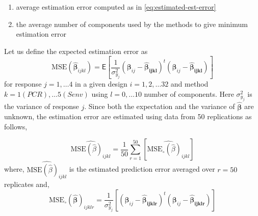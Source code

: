 \documentclass[12pt,3p,authoryear]{elsarticle}
\providecommand{\tightlist}{%
  \setlength{\itemsep}{0pt}\setlength{\parskip}{0pt}}
\begin{document}
\begin{enumerate}
\def\labelenumi{\alph{enumi})}
\tightlist
\item
  average estimation error computed as in \eqref{eq:estimated-est-error}
\item
  the average number of components used by the methods to give minimum estimation error
\end{enumerate}

Let us define the expected estimation error as
\begin{equation}
  \text{MSE}\left(
    \boldsymbol{\hat{\beta}}_{ijkl}
  \right) =
  \mathsf{E}{\left[
    \frac{1}{\sigma_{y_j}^2}\left(
      \boldsymbol{\beta}_{ij} - \boldsymbol{\hat{\beta}_{ijkl}}
    \right)^t
    \left(
      \boldsymbol{\beta}_{ij} - \boldsymbol{\hat{\beta}_{ijkl}}
    \right)
  \right]}
\label{eq:est-error}
\end{equation}
for response \(j = 1, \ldots 4\) in a given design \(i=1, 2, \ldots 32\) and method \(k=1(PCR), \ldots 5(Senv)\) using \(l=0, \ldots 10\) number of components. Here \(\sigma_{y_j}^2\) is the variance of response \(j\). Since both the expectation and the variance of \(\hat{\boldsymbol{\beta}}\) are unknown, the estimation error are estimated using data from 50 replications as follows,

\begin{equation}
\widehat{\text{MSE}\left(\hat{\beta}\right)_{ijkl}} =
  \frac{1}{50}\sum_{r=1}^{50}{\left[
    \widehat{\text{MSE}_\circ\left(\hat{\beta}\right)_{ijkl}}  
  \right]}
\label{eq:estimated-est-error}
\end{equation}
where, \(\widehat{\text{MSE}\left(\hat{\beta}\right)_{ijkl}}\) is the estimated prediction error averaged over \(r=50\) replicates and, \[\text{MSE}_\circ\left(\boldsymbol{\hat{\beta}}\right)_{ijklr} = \frac{1}{\sigma_{y_j}^2}\left[\left(\boldsymbol{\beta}_{ij} -\boldsymbol{\hat{\beta}_{ijklr}}\right)^t\left(\boldsymbol{\beta}_{ij} - \boldsymbol{\hat{\beta}_{ijklr}}\right)
  \right]\]
\end{document}
